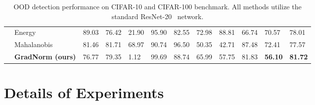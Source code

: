 \documentclass{article}
\begin{document}
\begin{table}[h]
{\begin{tabular}{c|l|C{0.03\textwidth}C{0.045\textwidth}|C{0.03\textwidth}C{0.045\textwidth}|C{0.03\textwidth}C{0.045\textwidth}|C{0.03\textwidth}C{0.045\textwidth}|C{0.03\textwidth}C{0.045\textwidth}}
                                  & Energy\tiny{~\cite{liu2020energy}}                                                & 89.03                & 76.42                 & 21.90                & 95.90                 & {82.55}       & {72.98}        & 88.81                & 66.74                 & 70.57                & 78.01                \\
                                  & Mahalanobis\tiny{~\cite{lee2018simple}}                                           & 81.46 &	81.71 &	68.97 &	90.74 &	96.50 &	50.35 &	42.71 &	87.48 &	72.41 &	77.57                \\
                                  & \textbf{GradNorm (ours)}                              & 76.77                & 79.35                 & {1.12}        & {99.69}        & 88.74                & 65.99                 & {57.75}       & {81.83}        & \textbf{56.10}       & \textbf{81.72}       \\ 
\bottomrule
\end{tabular}
}
    \caption{\small{OOD detection performance on CIFAR-10 and CIFAR-100 benchmark. All methods utilize the standard ResNet-20~\cite{he2016deep} network.
}}
    \label{tab:cifar_results}
    \vspace{-0.5cm}
\end{table}

\section{Details of Experiments}
\label{app:exp_detail}
\end{document}
